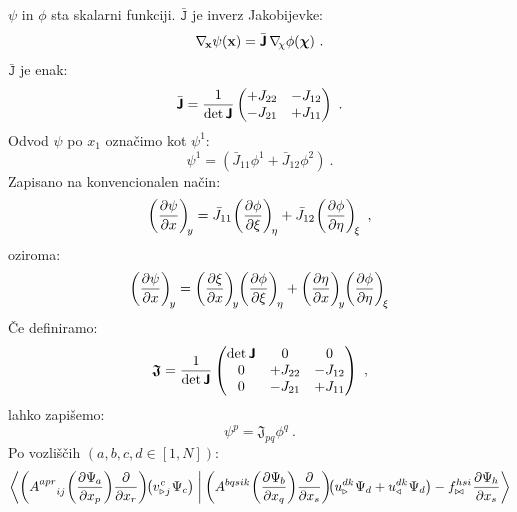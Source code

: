 $\psi$ in $\phi$ sta skalarni funkciji. $\bar{\texttt{J}}$ je inverz Jakobijevke:
\begin{equation}
   \mathbf{\nabla_{\mkern-3mu x}} \psi(\mathbf{x}) = \bar{\bm{\mathsf{J}}} \mkern3mu \mathbf{\nabla_{\mkern-4mu \chi}} \phi(\bm{\chi}) \ .
\end{equation}
$\bar{\texttt{J}}$ je enak:
\begin{equation}
   \bar{\bm{\mathsf{J}}}
   =
   \frac{1}{\det \bm{\mathsf{J}}}
   \begin{pmatrix}
      +J_{22} & -J_{12} \\
      -J_{21} & +J_{11}
   \end{pmatrix}
   \ .
\end{equation}
Odvod $\psi$ po $x_1$ označimo kot $\psi^1$:
\begin{equation}
   \psi^1 = \left(\bar{J}_{11} \phi^1 + \bar{J}_{12} \phi^2 \right) \ .
\end{equation}
Zapisano na konvencionalen način:
\begin{equation}
   \left(\frac{\partial \psi}{\partial x}\right)_{\mkern-4mu y}
   =
   \bar{J}_{11} \mkern-2mu \left(\frac{\partial \phi}{\partial \xi}\right)_{\mkern-3mu \eta}
   +
   \bar{J}_{12} \mkern-2mu \left(\frac{\partial \phi}{\partial \eta}\right)_{\mkern-3mu \xi} \ ,
\end{equation}
oziroma:
\begin{equation}
   \left(\frac{\partial \psi}{\partial x} \right)_{\mkern-3mu y}
   =
   \left(\frac{\partial \xi}{\partial x} \right)_{\mkern-4mu y}
   \mkern-4mu \left(\frac{\partial \phi}{\partial \xi}\right)_{\mkern-3mu \eta}
   +
   \left(\frac{\partial \eta}{\partial x}\right)_{\mkern-4mu y}
   \mkern-4mu \left(\frac{\partial \phi}{\partial \eta}\right)_{\mkern-3mu \xi}
\end{equation}
Če definiramo:
\begin{equation}
   \bm{\mathsf{\mathfrak{J}}}
   =
   \frac{1}{\det \bm{\mathsf{J}}}
   \begin{pmatrix}
      \det \bm{\mathsf{J}} & 0       & 0       \\
      0                & +J_{22} & -J_{12} \\
      0                & -J_{21} & +J_{11}
   \end{pmatrix} \ ,
\end{equation}
lahko zapišemo:
\begin{equation}
   \psi^p = \mathfrak{J}_{pq} \phi^{q} \ .
   \label{eq:refToEmt}
\end{equation}
Po vozliščih $(a, b, c, d \in [1,N])$:
\begin{equation}
   \braket{
      \qty(A^{a p r}_{\mkern28mu i j} \mkern1mu
      \qty( \pdv{\Psi_{\mkern-1mu a}}{x_p} ) \pdv{}{x_r} ) \mkern-2mu
      \qty(v^{\mkern1mu c}_{\triangleright \mkern1mu j} \mkern1mu \Psi_c ) \mkern5mu  }
   {
      \mkern4mu \qty(A^{b q s i k} \mkern1mu
      \qty( \pdv{\Psi_{\mkern-1mu b}}{x_q} ) \pdv{}{x_s} ) \mkern-4mu
      \qty(u^{d k}_\triangleright \mkern1mu \Psi_d + u^{d k}_\triangleleft \mkern1mu \Psi_d )
      -
      f^{h s i}_{\bowtie} \mkern1mu \pdv{\Psi_{\mkern-1mu h}}{x_s} }
\end{equation}
